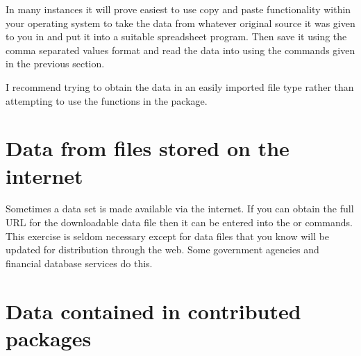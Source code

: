 In many instances it will prove easiest to use copy and paste functionality within your operating system to take the data from whatever original source it was given to you in and put it into a suitable spreadsheet program. Then save it using the comma separated values format and read the data into \R{} using the commands given in the previous section.

I recommend trying to obtain the data in an easily imported file type rather than attempting to use the functions in the  package.

\section{Data from files stored on the internet}

Sometimes a data set is made available via the internet. If you can obtain the full URL for the downloadable data file then it can be entered into the  or  commands. This exercise is seldom necessary except for data files that you know will be updated for distribution through the web. Some government agencies and financial database services do this.

\section{Data contained in contributed packages}
\label{DataFromPackages}


